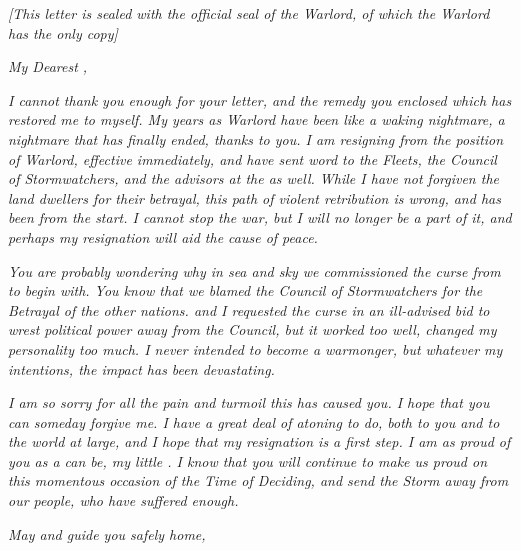 \documentclass[white]{GL2020}
\begin{document}
\name{\wWarlordResignationOfficial{}}

\emph{[This letter is sealed with the official seal of the Warlord, of which the Warlord has the only copy]}

\vspace{1cm}

\textsl{My Dearest \cWarlordDaughter{},}

\vspace{0.5cm}

\textsl{I cannot thank you enough for your letter, and the remedy you enclosed which has restored me to myself. My years as Warlord have been like a waking nightmare, a nightmare that has finally ended, thanks to you. I am resigning from the position of Warlord, effective immediately, and have sent word to the Fleets, the Council of Stormwatchers, and the \pShip{} advisors at the \pSc{} as well. While I have not forgiven the land dwellers for their betrayal, this path of violent retribution is wrong, and has been from the start. I cannot stop the war, but I will no longer be a part of it, and perhaps my resignation will aid the cause of peace.}

\textsl{You are probably wondering why in sea and sky we commissioned the curse from \cCurse{\full} to begin with. You know that we blamed the Council of Stormwatchers for the Betrayal of the other nations. \cQuiet{} and I requested the curse in an ill-advised bid to wrest political power away from the Council, but it worked too well, changed my personality too much. I never intended to become a warmonger, but whatever my intentions, the impact has been devastating.}

\textsl{I am so sorry for all the pain and turmoil this has caused you. I hope that you can someday forgive me. I have a great deal of atoning to do, both to you and to the world at large, and I hope that my resignation is a first step. I am as proud of you as a \cLoud{\parent} can be, my little \cWarlordDaughter{}. I know that you will continue to make us proud on this momentous occasion of the Time of Deciding, and send the Storm away from our people, who have suffered enough.}

\vspace{0.5cm}

\textsl{May \cEbb{} and \cFlow{} guide you safely home,}
\textsl{\cLoud{\full}}
\end{document}
